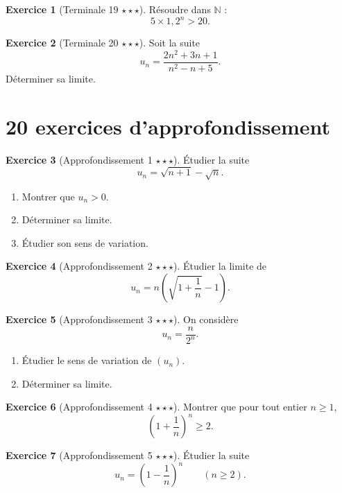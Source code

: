 \documentclass[11pt,a4paper]{article}
\theoremstyle{definition}
\newtheorem{exercice}{Exercice}[section]
\newcommand{\N}{\mathbb{N}}
\newcommand{\etoile}[1]{\hfill{\small\textbf{#1}}}
\begin{document}
\begin{exercice}[Terminale 19 \etoile{$\star\star\star$}]
Résoudre dans $\N$ :
\[
5\times 1{,}2^n>20.
\]
\end{exercice}

\begin{exercice}[Terminale 20 \etoile{$\star\star\star$}]
Soit la suite
\[
u_n=\frac{2n^2+3n+1}{n^2-n+5}.
\]
Déterminer sa limite.
\end{exercice}

\section{20 exercices d'approfondissement}

\begin{exercice}[Approfondissement 1 \etoile{$\star\star\star$}]
Étudier la suite
\[
u_n=\sqrt{n+1}-\sqrt{n}.
\]
\begin{enumerate}[label=\arabic*.]
    \item Montrer que $u_n>0$.
    \item Déterminer sa limite.
    \item Étudier son sens de variation.
\end{enumerate}
\end{exercice}

\begin{exercice}[Approfondissement 2 \etoile{$\star\star\star$}]
Étudier la limite de
\[
u_n=n\left(\sqrt{1+\frac1n}-1\right).
\]
\end{exercice}

\begin{exercice}[Approfondissement 3 \etoile{$\star\star\star$}]
On considère
\[
u_n=\frac{n}{2^n}.
\]
\begin{enumerate}[label=\arabic*.]
    \item Étudier le sens de variation de $(u_n)$.
    \item Déterminer sa limite.
\end{enumerate}
\end{exercice}

\begin{exercice}[Approfondissement 4 \etoile{$\star\star\star$}]
Montrer que pour tout entier $n\ge1$,
\[
\left(1+\frac1n\right)^n\ge 2.
\]
\end{exercice}

\begin{exercice}[Approfondissement 5 \etoile{$\star\star\star$}]
Étudier la suite
\[
u_n=\left(1-\frac1n\right)^n
\qquad (n\ge2).
\]
\end{exercice}
\end{document}
